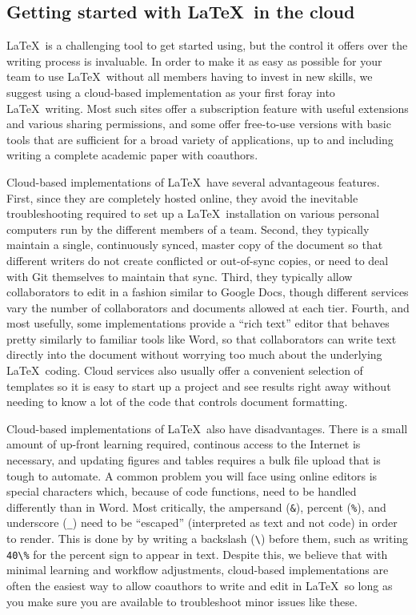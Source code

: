 \subsection{Getting started with \LaTeX\ in the cloud}

\LaTeX\ is a challenging tool to get started using,
but the control it offers over the writing process is invaluable.
In order to make it as easy as possible for your team
to use \LaTeX\ without all members having to invest in new skills,
we suggest using a cloud-based implementation as your first foray into \LaTeX\ writing.
Most such sites offer a subscription feature with useful extensions and various sharing permissions,
and some offer free-to-use versions with basic tools that are sufficient
for a broad variety of applications,
up to and including writing a complete academic paper with coauthors.

Cloud-based implementations of \LaTeX\ have several advantageous features.
First, since they are completely hosted online,
they avoid the inevitable troubleshooting required to set up a \LaTeX\ installation
on various personal computers run by the different members of a team.
Second, they typically maintain a single, continuously synced, master copy of the document
so that different writers do not create conflicted or out-of-sync copies,
or need to deal with Git themselves to maintain that sync.
Third, they typically allow collaborators to edit in a fashion similar to Google Docs,
though different services vary the number of collaborators and documents allowed at each tier.
Fourth, and most usefully, some implementations provide a ``rich text'' editor
that behaves pretty similarly to familiar tools like Word,
so that collaborators can write text directly into the document without worrying too much
about the underlying \LaTeX\ coding.
Cloud services also usually offer a convenient selection of templates
so it is easy to start up a project and see results right away
without needing to know a lot of the code that controls document formatting.

Cloud-based implementations of \LaTeX\ also have disadvantages.
There is a small amount of up-front learning required,
continous access to the Internet is necessary,
and updating figures and tables requires a bulk file upload that is tough to automate.
A common problem you will face using online editors is special characters
which, because of code functions, need to be handled differently than in Word.
Most critically, the ampersand (\texttt{\&}), percent (\texttt{\%}), and underscore (\texttt{\_})
need to be ``escaped'' (interpreted as text and not code) in order to render.
This is done by by writing a backslash (\texttt{\textbackslash}) before them,
such as writing \texttt{40\textbackslash\%} for the percent sign to appear in text.
Despite this, we believe that with minimal learning and workflow adjustments,
cloud-based implementations are often the easiest way to allow coauthors to write and edit in \LaTeX\,
so long as you make sure you are available to troubleshoot minor issues like these.


